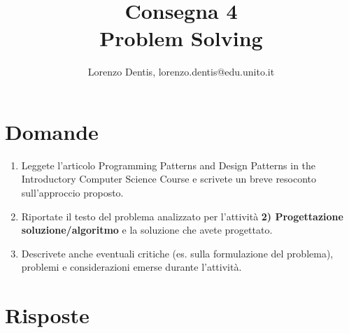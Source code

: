 \documentclass[a4paper]{article}
\begin{document}
\author{Lorenzo Dentis, lorenzo.dentis@edu.unito.it}
\title{Consegna 4 \\ \large Problem Solving}
\maketitle

\section{Domande}
\begin{enumerate}
	\item Leggete l'articolo Programming Patterns and Design Patterns in the Introductory Computer Science Course e scrivete un breve resoconto sull'approccio proposto.
	\item Riportate il testo del problema analizzato per l'attività \textbf{2) Progettazione soluzione/algoritmo} e la soluzione che avete progettato.
	\item Descrivete anche eventuali critiche (es. sulla formulazione del problema), problemi e considerazioni emerse durante l'attività.
\end{enumerate}
\section{Risposte}
\end{document}
